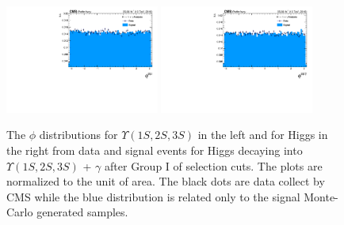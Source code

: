 \begin{figure}[!htbp]
\begin{center}
\includegraphics[width=0.45\textwidth]{figures_and_tables/outputPlots/HtoUpsilon_Cat0_ZZZZZ/au/data_x_mc/noKinCuts/h_noKin_Upsilon_phi}\hspace*{1.cm}
\includegraphics[width=0.45\textwidth]{figures_and_tables/outputPlots/HtoUpsilon_Cat0_ZZZZZ/au/data_x_mc/noKinCuts/h_noKin_Z_phi}
\end{center}\vspace*{-.5cm}
\caption{The $\phi$ distributions for $\Upsilon(1S,2S,3S)$ in the left and for Higgs in the right from data and signal events for Higgs decaying into $\Upsilon(1S,2S,3S)$ + $\gamma$ after Group I of selection cuts. The plots are normalized to the unit of area. The black dots are data collect by CMS while the blue distribution is related only to the signal Monte-Carlo generated samples.}
\label{fig:phiUpsilon_and_Higgs_HtoUpsilon_Cat0}
\end{figure}


